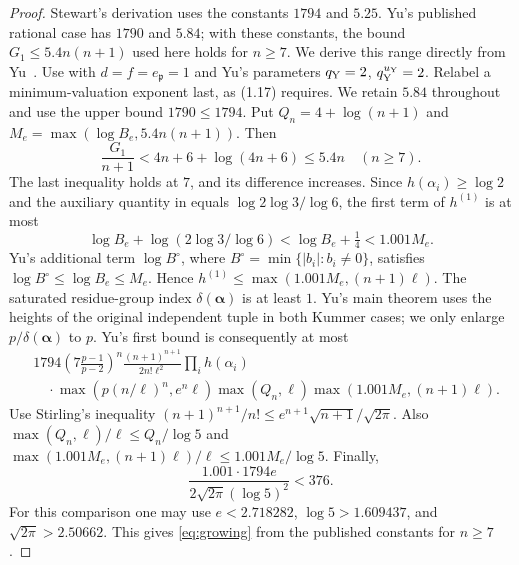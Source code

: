 \documentclass{amsart}
\theoremstyle{remark}
\numberwithin{equation}{section}
\begin{document}
\begin{proof}
Stewart's derivation uses the constants $1794$ and $5.25$.
Yu's published rational case has $1790$ and $5.84$; with these constants,
the bound $G_1\le5.4n(n+1)$ used here holds for $n\ge7$.
We derive this range directly from Yu~\cite{Yu2013}.
Use \cite[(1.9), (1.11), (1.13), (1.28), (1.30)--(1.31)]{Yu2013}
with $d=f=e_{\mathfrak p}=1$ and Yu's parameters
$q_{\rm Y}=2$, $q_{\rm Y}^{u_{\rm Y}}=2$.
Relabel a minimum-valuation exponent last, as (1.17) requires.
We retain $5.84$ throughout and use the upper bound $1790\le1794$.
Put $Q_n=4+\log(n+1)$ and $M_e=\max(\log B_e,5.4n(n+1))$.
Then
\[
\frac{G_1}{n+1}<4n+6+\log(4n+6)\le5.4n\quad(n\ge7).
\]
The last inequality holds at $7$, and its difference increases.
Since $h(\alpha_i)\ge\log2$ and the auxiliary quantity in
\cite[(1.15)]{Yu2013} equals $\log2\log3/\log6$,
the first term of $h^{(1)}$ is at most
\[
\log B_e+\log(2\log3/\log6)<\log B_e+\tfrac14<1.001M_e.
\]
Yu's additional term $\log B^\circ$, where
$B^\circ=\min\{|b_i|:b_i\ne0\}$, satisfies
$\log B^\circ\le\log B_e\le M_e$.
Hence $h^{(1)}\le\max(1.001M_e,(n+1)\ell)$.
The saturated residue-group index $\delta(\boldsymbol\alpha)$ is at least $1$.
Yu's main theorem uses the heights of the original independent tuple
in both Kummer cases; we only enlarge $p/\delta(\boldsymbol\alpha)$ to $p$.
Yu's first bound is consequently at most
\[
\begin{split}
&1794\left(7\frac{p-1}{p-2}\right)^n
 \frac{(n+1)^{n+1}}{2n!\ell^2}\prod_i h(\alpha_i)\\
&\quad\cdot\max\left(p(n/\ell)^n,e^n\ell\right)
 \max(Q_n,\ell)\max(1.001M_e,(n+1)\ell).
\end{split}
\]
Use Stirling's inequality
$(n+1)^{n+1}/n!\le e^{n+1}\sqrt{n+1}/\sqrt{2\pi}$.
Also $\max(Q_n,\ell)/\ell\le Q_n/\log5$ and
$\max(1.001M_e,(n+1)\ell)/\ell\le1.001M_e/\log5$.
Finally,
\[
\frac{1.001\cdot1794e}{2\sqrt{2\pi}(\log5)^2}<376.
\]
For this comparison one may use
$e<2.718282$, $\log5>1.609437$, and $\sqrt{2\pi}>2.50662$.
This gives \eqref{eq:growing} from the published constants for $n\ge7$.
\end{proof}
\end{document}
